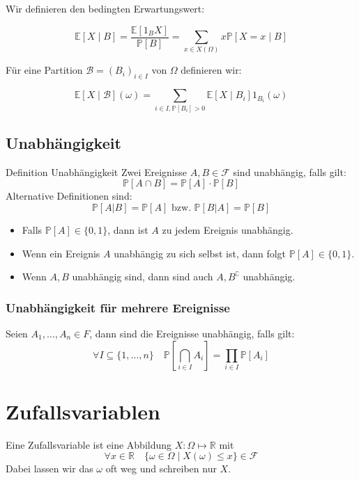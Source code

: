 \documentclass[a4paper,10pt]{article}
\def\R{\mathbb{R}}
\def\P{\mathbb{P}}
\def\F{\mathcal{F}}
\def\E{\mathbb{E}}
\begin{document}
Wir definieren den bedingten Erwartungswert:

$$
\E[X \mid B] = \frac{\E[1_B X]}{\P[B]} = \sum_{x \in X(\Omega)} x \P[X = x \mid B]
$$

Für eine Partition $\mathcal{B} = (B_i)_{i \in I}$ von $\Omega$ definieren wir:

$$
\E[X \mid \mathcal{B}](\omega) = \sum_{i \in I, \P[B_i] > 0} \E[X \mid B_i] 1_{B_i}(\omega)
$$

\subsection{Unabhängigkeit}
\begin{mainbox}{Definition Unabhängigkeit}
	Zwei Ereignisse \(A, B\in \F\) sind unabhängig, falls gilt:
	\[\P[A\cap B] = \P[A] \cdot \P[B]\]
	Alternative Definitionen sind:
	\[\P[A|B] = \P[A] \text{ bzw. } \P[B|A] = \P[B]\]
\end{mainbox}
\begin{itemize}
	\item Falls \(\P[A] \in \{0,1\}\), dann ist \(A\) zu jedem Ereignis unabhängig.
	\item Wenn ein Ereignis \(A\) unabhängig zu sich selbst ist, dann folgt \(\P[A] \in \{0,1\}\).
	\item Wenn \(A, B\) unabhängig sind, dann sind auch \(A, B^\complement\) unabhängig.
\end{itemize}
\subsubsection*{Unabhängigkeit für mehrere Ereignisse}
Seien \(A_1, \ldots, A_n \in F\), dann sind die Ereignisse unabhängig, falls gilt:
\[\forall I \subseteq \{1, \ldots, n\} \quad \P[\bigcap_{i\in I}A_i] = \prod_{i\in I} \P[A_i]\]

\section{Zufallsvariablen}
Eine Zufallsvariable ist eine Abbildung \(X: \Omega \mapsto \R\) mit
\[\forall x \in \R \quad \{\omega \in \Omega \mid X(\omega) \leq x\} \in \F\]
Dabei lassen wir das \(\omega\) oft weg und schreiben nur \(X\).
\end{document}
